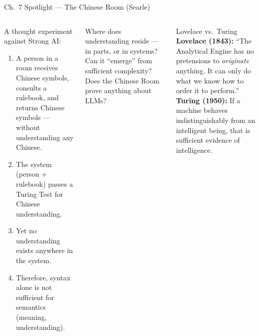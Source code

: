 \documentclass[aspectratio=169,10pt]{beamer}
\begin{document}
\begin{frame}[shrink=5]{Ch.~7 Spotlight --- The Chinese Room (Searle)}
\begin{columns}[c]
\begin{argumentbox}
\footnotesize A thought experiment against Strong AI:
\begin{enumerate}
  \item A person in a room receives Chinese symbols, consults a rulebook, and returns Chinese symbols --- without understanding any Chinese.
  \item The system (person + rulebook) passes a Turing Test for Chinese understanding.
  \item Yet no understanding exists anywhere in the system.
  \item Therefore, syntax alone is not sufficient for semantics (meaning, understanding).
\end{enumerate}
\end{argumentbox}
\vspace{0.25em}
\begin{discussionbox}
\footnotesize Where does understanding reside --- in parts, or in systems? Can it ``emerge'' from sufficient complexity? Does the Chinese Room prove anything about LLMs?
\end{discussionbox}
\begin{block}{Lovelace vs.\ Turing}
\footnotesize
\textbf{Lovelace (1843):} ``The Analytical Engine has no pretensions to \emph{originate} anything. It can only do what we know how to order it to perform.''\\[0.4em]
\textbf{Turing (1950):} If a machine behaves indistinguishably from an intelligent being, that is sufficient evidence of intelligence.
\end{block}
\end{columns}
\end{frame}
\end{document}

